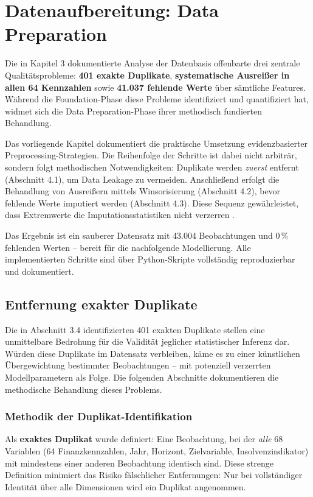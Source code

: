 \chapter{Datenaufbereitung: Data Preparation}

Die in Kapitel 3 dokumentierte Analyse der Datenbasis offenbarte drei zentrale Qualitätsprobleme: \textbf{401 exakte Duplikate}, \textbf{systematische Ausreißer in allen 64 Kennzahlen} sowie \textbf{41.037 fehlende Werte} über sämtliche Features. Während die Foundation-Phase diese Probleme identifiziert und quantifiziert hat, widmet sich die Data Preparation-Phase ihrer methodisch fundierten Behandlung.

Das vorliegende Kapitel dokumentiert die praktische Umsetzung evidenzbasierter Preprocessing-Strategien. Die Reihenfolge der Schritte ist dabei nicht arbiträr, sondern folgt methodischen Notwendigkeiten: Duplikate werden \textit{zuerst} entfernt (Abschnitt 4.1), um Data Leakage zu vermeiden. Anschließend erfolgt die Behandlung von Ausreißern mittels Winsorisierung (Abschnitt 4.2), bevor fehlende Werte imputiert werden (Abschnitt 4.3). Diese Sequenz gewährleistet, dass Extremwerte die Imputationsstatistiken nicht verzerren \parencite{goodfellow2016deep}.

Das Ergebnis ist ein sauberer Datensatz mit 43.004 Beobachtungen und 0\,\% fehlenden Werten – bereit für die nachfolgende Modellierung. Alle implementierten Schritte sind über Python-Skripte vollständig reproduzierbar und dokumentiert.

\section{Entfernung exakter Duplikate}

Die in Abschnitt 3.4 identifizierten 401 exakten Duplikate stellen eine unmittelbare Bedrohung für die Validität jeglicher statistischer Inferenz dar. Würden diese Duplikate im Datensatz verbleiben, käme es zu einer künstlichen Übergewichtung bestimmter Beobachtungen – mit potenziell verzerrten Modellparametern als Folge. Die folgenden Abschnitte dokumentieren die methodische Behandlung dieses Problems.

\subsection{Methodik der Duplikat-Identifikation}

Als \textbf{exaktes Duplikat} wurde definiert: Eine Beobachtung, bei der \textit{alle} 68 Variablen (64 Finanzkennzahlen, Jahr, Horizont, Zielvariable, Insolvenzindikator) mit mindestens einer anderen Beobachtung identisch sind. Diese strenge Definition minimiert das Risiko fälschlicher Entfernungen: Nur bei vollständiger Identität über alle Dimensionen wird ein Duplikat angenommen.

